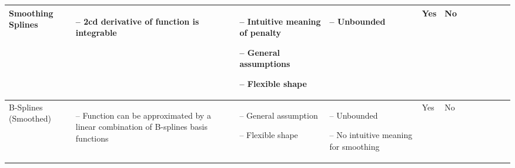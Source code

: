 \begin{table}[!ht]
\begin{tabular}{p{1.6cm}p{3.3cm}p{3.3cm}p{3.4cm}p{0.4cm}p{0.4cm}p{3cm}p{3cm}p{3cm}p{3cm}p{2.7cm}p{3cm}|}
		Smoothing Splines                                                                                                                                            &
		\begin{cptitemize} \item[--]  2cd derivative of function is integrable                                                        \end{cptitemize}               &
		\begin{cptitemize} \item[--]  Intuitive meaning of penalty \item[--]  General assumptions \item[--]  Flexible shape                         \end{cptitemize} &
		\begin{cptitemize} \item[--]  Unbounded                                                                                       \end{cptitemize}               &
		Yes                                                                                                                                                          &
		No                                                                                                                                                             \\ \hline%

		B-Splines (Smoothed)                                                                                                                                         &
		\begin{cptitemize} \item[--]  Function can be approximated by a linear combination of B-splines basis functions               \end{cptitemize}               &
		\begin{cptitemize} \item[--]  General assumption \item[--]  Flexible shape                                                            \end{cptitemize}        &
		\begin{cptitemize} \item[--]  Unbounded \item[--]  No intuitive meaning for smoothing                                                \end{cptitemize}        &
		Yes                                                                                                                                                            &
		No                                                                                                                                                             \\ \hline%


\end{tabular}
\end{table}
